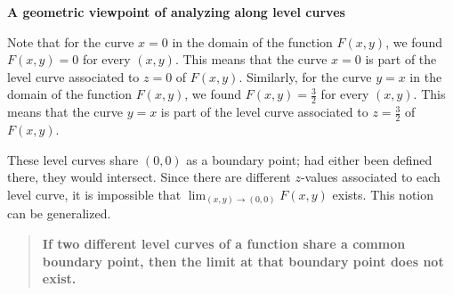 \documentclass{ximera}
\newcommand{\Lim}[2]{\lim_{#1 \to #2}}
\begin{document}
 \textbf{A geometric viewpoint of analyzing along level curves}

\begin{explanation}
Note that for the curve $x=0$ in the domain of the function $F(x,y)$, we found $F(x,y) = 0$ for every $(x,y)$.  This means that the curve $x=0$ is part of the level curve associated to $z=0$ of $F(x,y)$.  Similarly, for the curve $y=x$ in the domain of the function $F(x,y)$, we found $F(x,y) = \frac{3}{2}$ for every $(x,y)$.  This means that the curve $y=x$ is part of the level curve associated to $z= \frac{3}{2}$ of $F(x,y)$.

These level curves share $(0,0)$ as a boundary point; had either been defined there, they would intersect.  Since there are different $z$-values associated to each level curve, it is impossible that $\Lim{(x,y)}{(0,0)} F(x,y)$ exists.  This notion can be generalized.
\end{explanation}

\begin{quote}
\textbf{If two different level curves of a function share a common boundary point, then the limit at that boundary point does not exist.}
\end{quote} 
 
\end{document}
